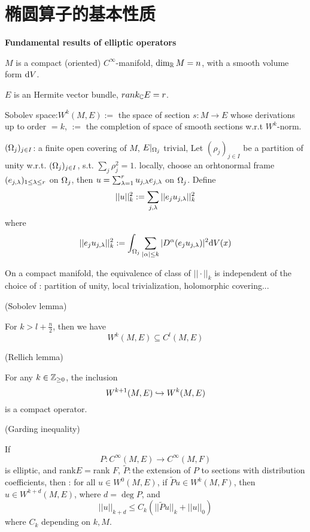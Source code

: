 \section{椭圆算子的基本性质}
\textbf{Fundamental results of elliptic operators}

$M$ is a compact (oriented) $C^\infty$-manifold, $\dim_{\mathbb{R}}M=n$,
with a smooth volume form $\mathrm{d} V$.

$E$ is an Hermite vector bundle, $rank_{\mathbb{C}}E=r$.

Sobolev space:$W^k(M,E):=$ the space of section $s:M\to E$
whose derivations up to order $=k$, $:=$ the completion of space
of smooth sections w.r.t $W^k$-norm.

$(\Omega_j)_{j\in I}$: a finite open covering of $M$, $E|_{\Omega_j}$ trivial,
Let $(\rho_j)_{j\in I}$ be a partition of unity w.r.t. $(\Omega_j)_{j\in I}$,
s.t. $\sum_{j}\rho^2_j=1$.
locally, choose an orhtonormal frame $(e_{j,\lambda})_{1\leq\lambda\leq r}$ on $\Omega_j$,
then $u=\sum_{\lambda=1}^ru_{j,\lambda}e_{j,\lambda}$ on $\Omega_j$. Define
$$||u||^2_k:=
  \sum_{j,\lambda}
    ||e_ju_{j,\lambda}||_k^2
$$
where
$$
  ||e_ju_{j,\lambda}||_k^2
:=
  \int_{\Omega_j}
    \sum_{|\alpha|\leq k}
      |D^\alpha(e_ju_{j,\lambda})|^2\mathrm{d} V(x)
$$

\begin{rem}
On a compact manifold,
the equivalence of class of $||\cdot||_k$ is independent of
the choice of : partition of unity,
local trivialization, holomorphic covering...
\end{rem}

\begin{lemma}(Sobolev lemma)

For $k>l+\frac{n}{2}$, then we have
$$W^k(M,E)\subseteq C^l(M,E)$$
\end{lemma}

\begin{lemma}(Rellich lemma)

For any $k\in\mathbb{Z}_{\geq 0}$, the inclusion
$$W^{k+1}(M,E)\hookrightarrow W^k(M,E)$$
is a compact operator.
\end{lemma}

\begin{lemma}(Garding inequality)

If
$$P:C^\infty(M,E)\to C^\infty(M,F)$$
is elliptic, and rank$E=$rank $F$,
$\tilde{P}:$the extension of $P$ to sections with distribution coefficients, then :
for all $u\in W^0(M,E)$, if $\tilde{P}u\in W^k(M,F)$, then
$u\in W^{k+d}(M,E)$, where $d=\deg P$, and
$$||u||_{k+d}\leq C_k
\left(
  ||\tilde{P}u||_k+||u||_0
\right)
$$
where $C_k$ depending on $k,M$.
\end{lemma}

